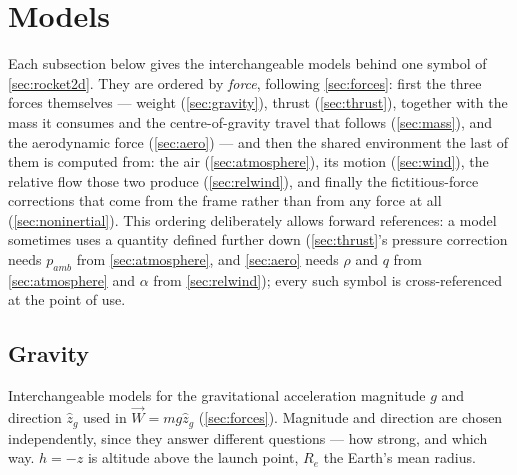 \section{Models}\label{sec:models}
Each subsection below gives the interchangeable models behind one symbol of
\autoref{sec:rocket2d}. They are ordered by \emph{force}, following \autoref{sec:forces}: first
the three forces themselves --- weight (\autoref{sec:gravity}), thrust (\autoref{sec:thrust}),
together with the mass it consumes and the centre-of-gravity travel that follows
(\autoref{sec:mass}), and the aerodynamic force (\autoref{sec:aero}) --- and then the shared
environment the last of them is computed from: the air (\autoref{sec:atmosphere}), its motion
(\autoref{sec:wind}), the relative flow those two produce (\autoref{sec:relwind}), and finally the
fictitious-force corrections that come from the frame rather than from any force at all
(\autoref{sec:noninertial}). This ordering deliberately allows forward references: a model
sometimes uses a quantity defined further down (\autoref{sec:thrust}'s pressure correction needs
$p_{amb}$ from \autoref{sec:atmosphere}, and \autoref{sec:aero} needs $\rho$ and $q$ from
\autoref{sec:atmosphere} and $\alpha$ from \autoref{sec:relwind}); every such symbol is
cross-referenced at the point of use.

\subsection{Gravity}\label{sec:gravity}
Interchangeable models for the gravitational acceleration magnitude $g$ and direction $\hat{z}_g$
used in $\vec{W}=mg\hat{z}_g$ (\autoref{sec:forces}). Magnitude and direction are chosen
independently, since they answer different questions --- how strong, and which way. $h=-z$ is
altitude above the launch point, $R_e$ the Earth's mean radius.

